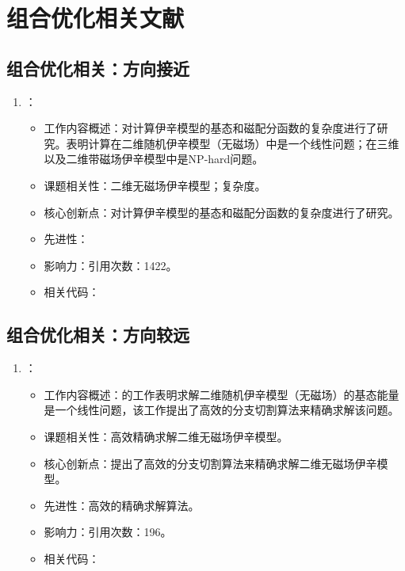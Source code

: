 \chapter{组合优化相关文献}
\section{组合优化相关：方向接近}
    \begin{enumerate}
        \item \citet{barahona1982computational}：
        \begin{itemize}
            \item 工作内容概述：对计算伊辛模型的基态和磁配分函数的复杂度进行了研究。表明计算在二维随机伊辛模型（无磁场）中是一个线性问题；在三维以及二维带磁场伊辛模型中是NP-hard问题。
            \item 课题相关性：二维无磁场伊辛模型；复杂度。
            \item 核心创新点：对计算伊辛模型的基态和磁配分函数的复杂度进行了研究。
            \item 先进性：
            \item 影响力：引用次数：1422。
            \item 相关代码：
        \end{itemize}

    \end{enumerate}
\section{组合优化相关：方向较远}
\begin{enumerate}
    \item \citet{de1995exact}：
        \begin{itemize}
            \item 工作内容概述：\citet{barahona1982computational}的工作表明求解二维随机伊辛模型（无磁场）的基态能量是一个线性问题，该工作提出了高效的分支切割算法来精确求解该问题。
            \item 课题相关性：高效精确求解二维无磁场伊辛模型。
            \item 核心创新点：提出了高效的分支切割算法来精确求解二维无磁场伊辛模型。
            \item 先进性：高效的精确求解算法。
            \item 影响力：引用次数：196。
            \item 相关代码：
        \end{itemize}

\end{enumerate}